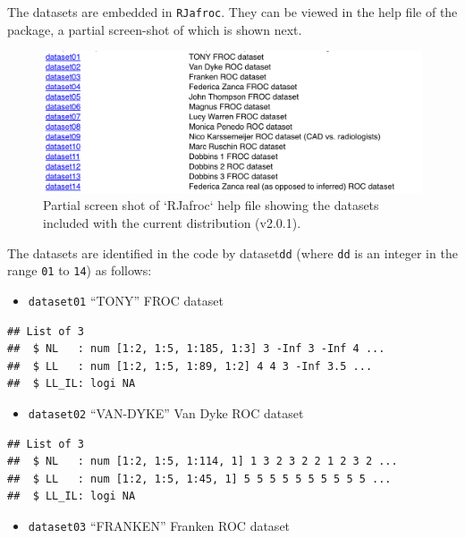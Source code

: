 \documentclass[
]{book}
\providecommand{\tightlist}{%
  \setlength{\itemsep}{0pt}\setlength{\parskip}{0pt}}
\begin{document}
The datasets are embedded in \texttt{RJafroc}. They can be viewed in the help file of the package, a partial screen-shot of which is shown next.

\begin{figure}

{\centering \includegraphics{images/compare-3-fits/datasets} 

}

\caption{Partial screen shot of `RJafroc` help file showing the datasets included with the current distribution (v2.0.1).}\label{fig:datasets-datasets}
\end{figure}

The datasets are identified in the code by dataset\texttt{dd} (where \texttt{dd} is an integer in the range \texttt{01} to \texttt{14}) as follows:

\begin{itemize}
\tightlist
\item
  \texttt{dataset01} ``TONY'' FROC dataset \citep{chakraborty2011estimating}
\end{itemize}

\begin{verbatim}
## List of 3
##  $ NL   : num [1:2, 1:5, 1:185, 1:3] 3 -Inf 3 -Inf 4 ...
##  $ LL   : num [1:2, 1:5, 1:89, 1:2] 4 4 3 -Inf 3.5 ...
##  $ LL_IL: logi NA
\end{verbatim}

\begin{itemize}
\tightlist
\item
  \texttt{dataset02} ``VAN-DYKE'' Van Dyke ROC dataset \citep{RN1993}
\end{itemize}

\begin{verbatim}
## List of 3
##  $ NL   : num [1:2, 1:5, 1:114, 1] 1 3 2 3 2 2 1 2 3 2 ...
##  $ LL   : num [1:2, 1:5, 1:45, 1] 5 5 5 5 5 5 5 5 5 5 ...
##  $ LL_IL: logi NA
\end{verbatim}

\begin{itemize}
\tightlist
\item
  \texttt{dataset03} ``FRANKEN'' Franken ROC dataset \citep{RN1995}
\end{itemize}
\end{document}
